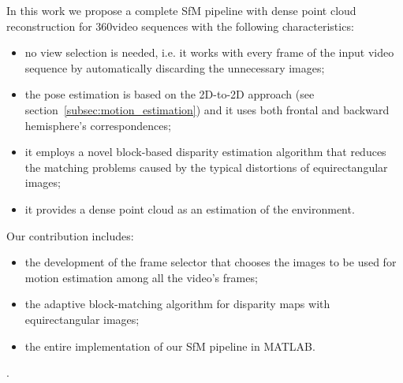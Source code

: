 In this work we propose a complete SfM pipeline with dense point cloud 
reconstruction for 360\degree video sequences with the following 
characteristics:
\begin{itemize}
	\item no view selection is needed, i.e. it works with every frame of the 
	input video sequence by automatically discarding the unnecessary images;
	\item the pose estimation is based on the 2D-to-2D approach
	(see section~\ref{subsec:motion_estimation}) and it uses both frontal and
	backward hemisphere's correspondences;
	\item it employs a novel block-based disparity estimation algorithm that 
	reduces the matching problems caused by the
	typical distortions of equirectangular images;
	\item it provides a dense point cloud as an estimation of the environment.
\end{itemize}
Our contribution includes:
\begin{itemize}
	\item the development of the frame selector that chooses the images to be
	used for motion estimation among all the video's frames;
	\item the adaptive block-matching algorithm for disparity maps with 
	equirectangular images;
	\item the entire implementation of our SfM pipeline in MATLAB.
\end{itemize}.
